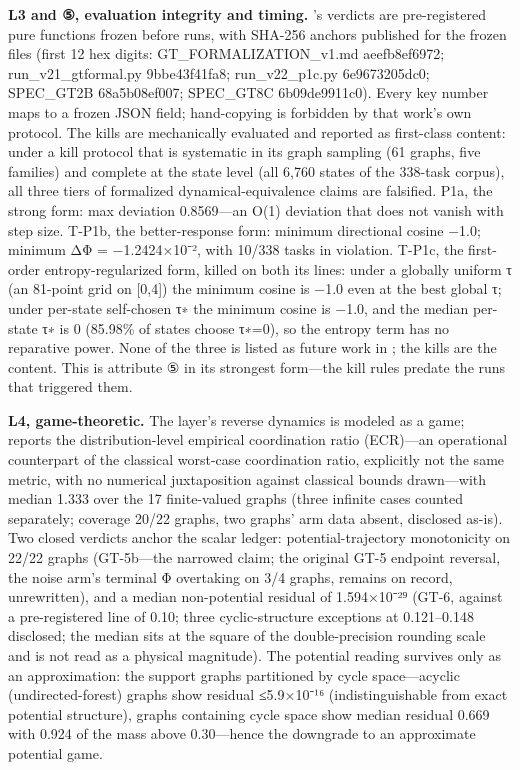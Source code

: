 \documentclass[11pt,a4paper]{article}
\begin{document}
\textbf{L3 and ⑤, evaluation integrity and timing.} \cite{key04}'s verdicts are pre-registered pure functions frozen before runs, with SHA-256 anchors published for the frozen files (first 12 hex digits: GT\_FORMALIZATION\_v1.md aeefb8ef6972; run\_v21\_gtformal.py 9bbe43f41fa8; run\_v22\_p1c.py 6e9673205dc0; SPEC\_GT2B 68a5b08ef007; SPEC\_GT8C 6b09de9911c0). Every key number maps to a frozen JSON field; hand-copying is forbidden by that work's own protocol. The kills are mechanically evaluated and reported as first-class content: under a kill protocol that is systematic in its graph sampling (61 graphs, five families) and complete at the state level (all 6,760 states of the 338-task corpus), all three tiers of formalized dynamical-equivalence claims are falsified. P1a, the strong form: max deviation 0.8569—an O(1) deviation that does not vanish with step size. T-P1b, the better-response form: minimum directional cosine −1.0; minimum ΔΦ = −1.2424×10⁻², with 10/338 tasks in violation. T-P1c, the first-order entropy-regularized form, killed on both its lines: under a globally uniform τ (an 81-point grid on [0,4]) the minimum cosine is −1.0 even at the best global τ; under per-state self-chosen τ∗ the minimum cosine is −1.0, and the median per-state τ∗ is 0 (85.98\% of states choose τ∗=0), so the entropy term has no reparative power. None of the three is listed as future work in \cite{key04}; the kills are the content. This is attribute ⑤ in its strongest form—the kill rules predate the runs that triggered them.

\textbf{L4, game-theoretic.} The layer's reverse dynamics is modeled as a game; \cite{key04} reports the distribution-level empirical coordination ratio (ECR)—an operational counterpart of the classical worst-case coordination ratio, explicitly not the same metric, with no numerical juxtaposition against classical bounds drawn—with median 1.333 over the 17 finite-valued graphs (three infinite cases counted separately; coverage 20/22 graphs, two graphs' arm data absent, disclosed as-is). Two closed verdicts anchor the scalar ledger: potential-trajectory monotonicity on 22/22 graphs (GT-5b—the narrowed claim; the original GT-5 endpoint reversal, the noise arm's terminal Φ overtaking on 3/4 graphs, remains on record, unrewritten), and a median non-potential residual of 1.594×10⁻²⁹ (GT-6, against a pre-registered line of 0.10; three cyclic-structure exceptions at 0.121–0.148 disclosed; the median sits at the square of the double-precision rounding scale and is not read as a physical magnitude). The potential reading survives only as an approximation: the support graphs partitioned by cycle space—acyclic (undirected-forest) graphs show residual ≤5.9×10⁻¹⁶ (indistinguishable from exact potential structure), graphs containing cycle space show median residual 0.669 with 0.924 of the mass above 0.30—hence the downgrade to an approximate potential game.
\end{document}
